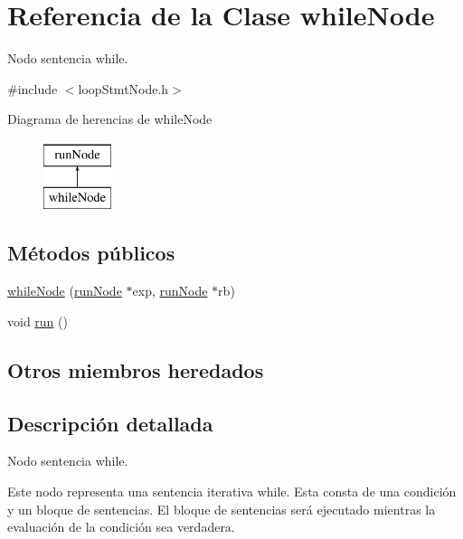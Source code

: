 \hypertarget{classwhileNode}{\section{Referencia de la Clase while\-Node}
\label{classwhileNode}
}


Nodo sentencia while.  




{\ttfamily \#include $<$loop\-Stmt\-Node.\-h$>$}

Diagrama de herencias de while\-Node\begin{figure}[H]
\begin{center}
\leavevmode
\includegraphics[height=2.000000cm]{classwhileNode}
\end{center}
\end{figure}
\subsection*{Métodos públicos}
\begin{DoxyCompactItemize}
\item 
\hyperlink{classwhileNode_a3d0dee0bc3202e77ed416e7af006aec7}{while\-Node} (\hyperlink{classrunNode}{run\-Node} $\ast$exp, \hyperlink{classrunNode}{run\-Node} $\ast$rb)
\item 
void \hyperlink{classwhileNode_ac46ec596fcf2cc2a4ec397de4bcdfef4}{run} ()
\end{DoxyCompactItemize}
\subsection*{Otros miembros heredados}


\subsection{Descripción detallada}
Nodo sentencia while. 

Este nodo representa una sentencia iterativa while. Esta consta de una condición y un bloque de sentencias. El bloque de sentencias será ejecutado mientras la evaluación de la condición sea verdadera. 

